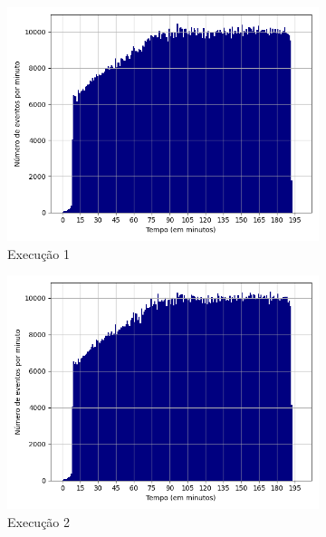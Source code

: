 \begin{figure}[p]
\begin{subfigure}{.5\textwidth}
  \centering
  \includegraphics[width=\linewidth]{figuras/graphics/histogram_vazao_5-dez-su.png}  
  \caption{Execução 1}
  \label{fig:histv-5-dez-su}
\end{subfigure}
\begin{subfigure}{.5\textwidth}
  \centering
  \includegraphics[width=\linewidth]{figuras/graphics/histogram_vazao_7-dez-su.png}  
  \caption{Execução 2}
  \label{fig:histv-7-dez-su}
\end{subfigure}
\begin{subfigure}{.5\textwidth}

\end{subfigure}
\end{figure}
